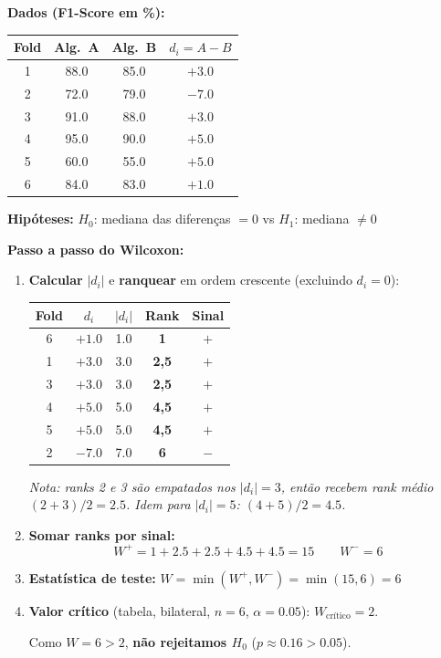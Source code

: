 \documentclass[12pt,a4paper]{article}
\begin{document}
\textbf{Dados (F1-Score em \%):}

\begin{center}
\begin{tabular}{cccc}
\toprule
Fold & Alg.\ A & Alg.\ B & $d_i = A - B$ \\
\midrule
1 & 88{.}0 & 85{.}0 & $+3{.}0$ \\
2 & 72{.}0 & 79{.}0 & $-7{.}0$ \\
3 & 91{.}0 & 88{.}0 & $+3{.}0$ \\
4 & 95{.}0 & 90{.}0 & $+5{.}0$ \\
5 & 60{.}0 & 55{.}0 & $+5{.}0$ \\
6 & 84{.}0 & 83{.}0 & $+1{.}0$ \\
\bottomrule
\end{tabular}
\end{center}

\textbf{Hipóteses:} $H_0$: mediana das diferenças $= 0$ \quad vs \quad $H_1$: mediana $\neq 0$

\textbf{Passo a passo do Wilcoxon:}

\begin{enumerate}
  \item \textbf{Calcular} $|d_i|$ e \textbf{ranquear} em ordem crescente (excluindo $d_i = 0$):

  \begin{center}
  \begin{tabular}{ccccc}
  \toprule
  Fold & $d_i$ & $|d_i|$ & Rank & Sinal \\
  \midrule
  6 & $+1{.}0$ & 1{.}0 & \textbf{1} & $+$ \\
  1 & $+3{.}0$ & 3{.}0 & \textbf{2,5} & $+$ \\
  3 & $+3{.}0$ & 3{.}0 & \textbf{2,5} & $+$ \\
  4 & $+5{.}0$ & 5{.}0 & \textbf{4,5} & $+$ \\
  5 & $+5{.}0$ & 5{.}0 & \textbf{4,5} & $+$ \\
  2 & $-7{.}0$ & 7{.}0 & \textbf{6}   & $-$ \\
  \bottomrule
  \end{tabular}
  \end{center}

  \textit{Nota: ranks 2 e 3 são empatados nos $|d_i|=3$, então recebem rank médio $(2+3)/2 = 2{.}5$. Idem para $|d_i|=5$: $(4+5)/2 = 4{.}5$.}

  \item \textbf{Somar ranks por sinal:}
  \[
    W^+ = 1 + 2{.}5 + 2{.}5 + 4{.}5 + 4{.}5 = 15 \qquad
    W^- = 6
  \]

  \item \textbf{Estatística de teste:} $W = \min(W^+, W^-) = \min(15, 6) = 6$

  \item \textbf{Valor crítico} (tabela, bilateral, $n=6$, $\alpha=0{.}05$): $W_{\text{crítico}} = 2$.

  Como $W = 6 > 2$, \textbf{não rejeitamos $H_0$} ($p \approx 0{.}16 > 0{.}05$).
\end{enumerate}
\end{document}
